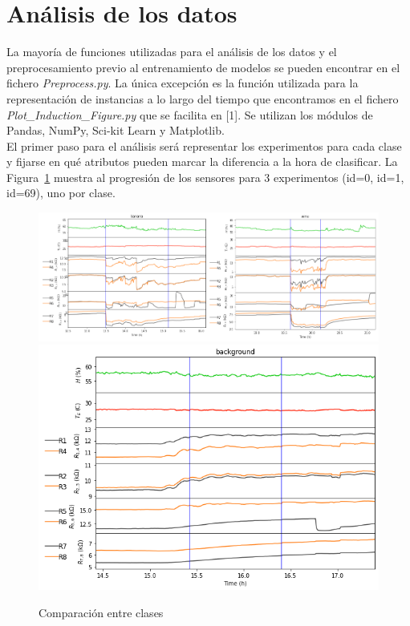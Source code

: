 \documentclass{esannV2}
\begin{document}
\section{Análisis  de los datos}
La mayoría de funciones utilizadas para el análisis de los datos y el preprocesamiento previo al entrenamiento de modelos se pueden encontrar en el fichero \textit{Preprocess.py}. La única excepción es la función utilizada para la representación de instancias a lo largo del tiempo que encontramos en el fichero \\ \textit{Plot\_Induction\_Figure.py} que se facilita en [1]. Se utilizan los módulos de Pandas, NumPy, Sci-kit Learn y Matplotlib. \\
El primer paso para el análisis será representar los experimentos para cada clase y fijarse en qué atributos pueden marcar la diferencia a la hora de clasificar. La Figura~\ref{fig:banvswinvsbck} muestra al progresión de los sensores para 3 experimentos (id=0, id=1, id=69), uno por clase.

\begin{figure}[b!]
\includegraphics[scale=0.35]{img/banvswin.png}
\centering
\includegraphics[scale=0.3]{img/background_69.png}
\caption{Comparación entre clases}\label{fig:banvswinvsbck}
\end{figure}
\end{document}
